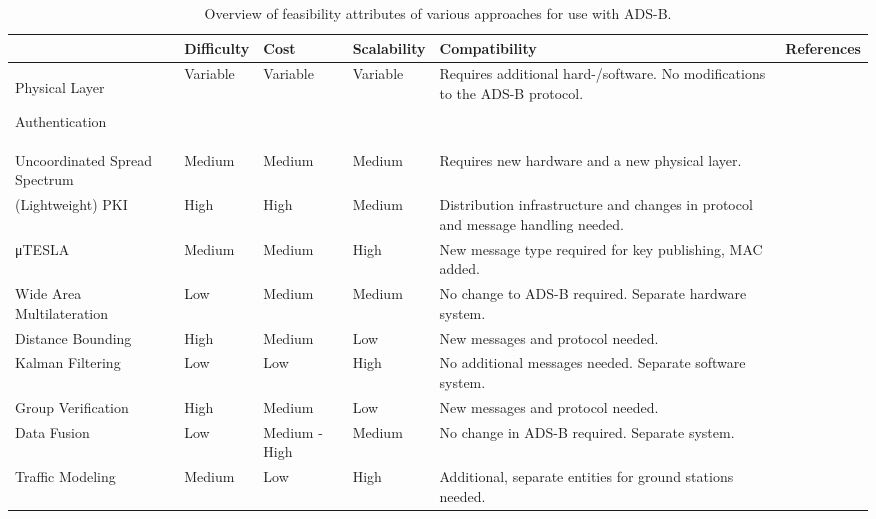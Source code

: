 \documentclass[english]{IEEEtran}
\providecommand{\tabularnewline}{\\}
\begin{document}
\begin{table*}[t]
\begin{centering}
\begin{tabular}{|>{\centering}p{2.5cm}|>{\centering}p{1.3cm}|>{\centering}p{1.2cm}|>{\centering}p{1.2cm}|>{\centering}p{4cm}|>{\centering}p{3cm}|}
\hline 
 & Difficulty  & Cost & Scalability & Compatibility & References\tabularnewline
\hline 
\hline 
Physical Layer 

Authentication & Variable & Variable & Variable & Requires additional hard-/software. No modifications to the ADS-B
protocol. & \cite{Danev2012,Danev2010,Zeng2010,hall2005radio,Jana2010,Maes2010,Devadas2008,Mathur2008,Zhang2010a,Wang2011a,Xiong,Qiu,Laurendeau2008,Laurendeau2009}\tabularnewline
\hline 
Uncoordinated Spread Spectrum & Medium & Medium & Medium & Requires new hardware and a new physical layer. & \cite{Strasser2008,Christina2009,Liu2010}\tabularnewline
\hline 
(Lightweight) PKI & High & High & Medium & Distribution infrastructure and changes in protocol and message handling
needed.  & \cite{Costin,Finke2013a,wessoncan,Samuelson2006,viggiano2010secure,schuchman2011automatic,Ziliang2010,Raya2005,Raya2007,Robinson2007,Parno,Zhang2010}\tabularnewline
\hline 
μTESLA & Medium & Medium & High & New message type required for key publishing, MAC added. & \cite{Perrig2003,Perrig2000,Perrig2005,Perrig2002,Liu,Eldefrawy2010,Haas2009,Hu2006}\tabularnewline
\hline 
Wide Area Multi\-lateration & Low & Medium & Medium & No change to ADS-B required. Separate hardware system. & \cite{Smith2006,Savvides2002,Neven2005,Purton2010,Johnson2012,Kaune2012,Thomas2011a,Daskalakis2003,Niles2012,Galati2005}\tabularnewline
\hline 
Distance Bounding & High & Medium & Low & New messages and protocol needed. & \cite{Brands1994,Song2008,Chiang2009,Chiang2012,Ranganathan,Tippenhauer2009}\tabularnewline
\hline 
Kalman Filtering & Low & Low & High & No additional messages needed. Separate software system. & \cite{Kovell2012,Kalman1960a,Welch1995,Fox2003,Krozel2004}\tabularnewline
\hline 
Group Verification & High & Medium & Low & New messages and protocol needed. & \cite{Sampigethaya2011,Kovell2012}\tabularnewline
\hline 
Data Fusion & Low & Medium - High & Medium & No change in ADS-B required. Separate system. & \cite{Baud2006,liu2013multi,Wei2003,Yan2008,smith2008method}\tabularnewline
\hline 
Traffic Modeling & Medium & Low & High & Additional, separate entities for ground stations needed. & \cite{schafer2013experimental,Xiao,Leinmuller2006}\tabularnewline
\hline 
\end{tabular}
\par\end{centering}

\caption{Overview of feasibility attributes of various approaches for use with
ADS-B. \label{tab:Overview3}}
\end{table*}
\end{document}
